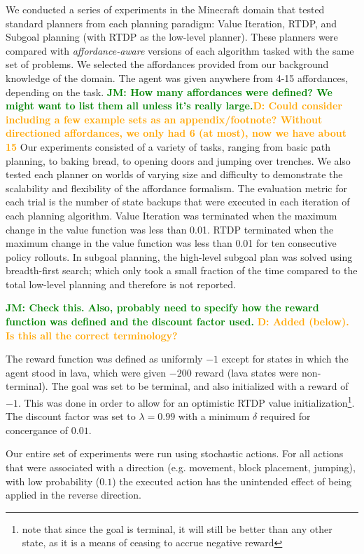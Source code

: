 \documentclass[]{article}
\newcommand{\jmnote}[1]{\textcolor{Green}{\textbf{JM: #1}}}
\newcommand{\dnote}[1]{\textcolor{Orange}{\textbf{D: #1}}}
\begin{document}
We conducted a series of experiments in the Minecraft domain that
tested standard planners from each planning paradigm:
Value Iteration, RTDP, and Subgoal planning (with RTDP as the low-level
planner). These planners were compared with {\it affordance-aware}
versions of each algorithm tasked with the same set of problems. We selected
the affordances provided from our background knowledge of the domain. The agent was given anywhere from 4-15 affordances, depending on the task. \jmnote{How many affordances were defined? We might want to list them all unless it's really large.}\dnote{Could consider including a few example sets as an appendix/footnote? Without directioned affordances, we only had 6 (at most), now we have about 15} Our experiments consisted
of a variety of tasks, ranging from basic path planning, to baking bread, to opening doors 
and jumping over trenches.  We also tested each planner on worlds 
of varying size and difficulty to demonstrate the scalability and flexibility of the affordance
formalism. The evaluation metric for each trial is the number of state backups that were 
executed in each iteration of each planning algorithm. Value Iteration was terminated when the maximum change in the value function was less than 0.01. RTDP terminated when the maximum change in the value function was less than 0.01 for ten consecutive policy rollouts. In subgoal planning, the high-level subgoal plan was solved using breadth-first search; which only took a small fraction of the time compared to the total low-level planning and therefore is not reported. 

\jmnote{Check this. Also, probably need to specify how the reward function was defined and the discount factor used.}
\dnote{Added (below). Is this all the correct terminology?}

The reward function was defined as uniformly $-1$ except for states in which the agent stood in lava, which were given $-200$ reward (lava states were non-terminal). The goal was set to be terminal, and also initialized with a reward of $-1$. This was done in order to allow for an optimistic RTDP value initialization\footnote{note that since the goal is terminal, it will still be better than any other state, as it is a means of ceasing to accrue negative reward}. The discount factor was set to $\lambda = 0.99$ with a minimum $\delta$ required for concergance of $0.01$. 


Our entire set of experiments were run using stochastic actions. For all actions that were associated with a direction (e.g. movement, block placement, jumping), with low probability ($0.1$) the executed action has the unintended effect of being applied in the reverse direction.
\end{document}
